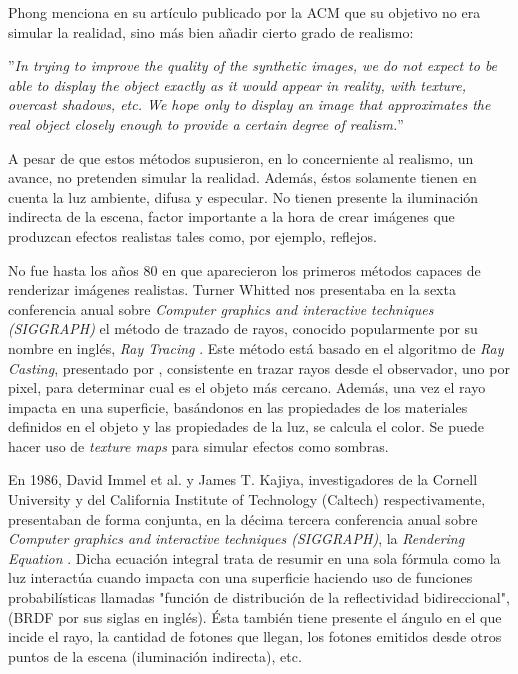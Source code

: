 \documentclass[titlepage,12pt]{report}
\begin{document}
Phong menciona en su artículo publicado por la ACM \citep[p.~311]{Phong1975} que su objetivo no era simular la realidad, sino más bien añadir cierto grado de realismo:
\vspace{5mm}

\begin{mdframed}[hidealllines=true,backgroundcolor=gray!20] ''\textit{In trying to improve the quality of the synthetic images, we do not expect to be able to display the object exactly as it would appear in reality, with texture, overcast shadows, etc. We hope only to display an image that approximates the real object closely enough to provide a certain degree of realism.}'' 
\end{mdframed}

A pesar de que estos métodos supusieron, en lo concerniente al realismo, un avance, no pretenden simular la realidad. Además, éstos solamente tienen en cuenta la luz ambiente, difusa y especular. No tienen presente la iluminación indirecta de la escena, factor importante a la hora de crear imágenes que produzcan efectos realistas tales como, por ejemplo, reflejos.

No fue hasta los años 80 en que aparecieron los primeros métodos capaces de renderizar imágenes realistas. Turner Whitted nos presentaba en la sexta conferencia anual sobre \textit{Computer graphics and interactive techniques (SIGGRAPH)} el método de trazado de rayos, conocido popularmente por su nombre en inglés, \textit{Ray Tracing} \citep{Whitted1980}. Este método está basado en el algoritmo de \textit{Ray Casting}, presentado por \citep{Appel1968}, consistente en trazar rayos desde el observador, uno por pixel, para determinar cual es el objeto más cercano. Además, una vez el rayo impacta en una superficie, basándonos en las propiedades de los materiales definidos en el objeto y las propiedades de la luz, se calcula el color. Se puede hacer uso de \textit{texture maps} para simular efectos como sombras. 

En 1986, David Immel et al. y James T. Kajiya, investigadores de la Cornell University y del California Institute of Technology (Caltech) respectivamente, presentaban de forma conjunta, en la décima tercera conferencia anual sobre \textit{Computer graphics and interactive techniques (SIGGRAPH)}, la \textit{Rendering Equation} \citep{Kajiya1986, Immel1986}. Dicha ecuación integral trata de resumir en una sola fórmula como la luz interactúa cuando impacta con una superficie haciendo uso de funciones probabilísticas llamadas "función de distribución de la reflectividad bidireccional", (BRDF por sus siglas en inglés). Ésta también tiene presente el ángulo en el que incide el rayo, la cantidad de fotones que llegan, los fotones emitidos desde otros puntos de la escena (iluminación indirecta), etc.
\end{document}
